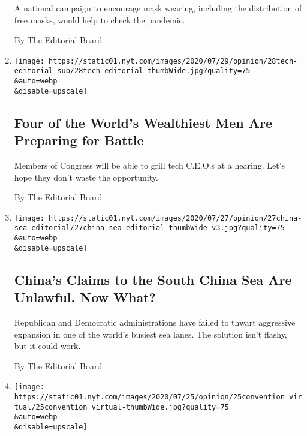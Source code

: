 \begin{enumerate}
  A national campaign to encourage mask wearing, including the
  distribution of free masks, would help to check the pandemic.

  By The Editorial Board
\item
  \href{/2020/07/28/opinion/tech-ceo-hearing-congress.html}{}

  \texttt{[image: https://static01.nyt.com/images/2020/07/29/opinion/28tech-editorial-sub/28tech-editorial-thumbWide.jpg?quality=75\\\&auto=webp\\\&disable=upscale]}

  \hypertarget{four-of-the-worlds-wealthiest-men-are-preparing-for-battle}{%
  \subsection{Four of the World's Wealthiest Men Are Preparing for
  Battle}\label{four-of-the-worlds-wealthiest-men-are-preparing-for-battle}}

  Members of Congress will be able to grill tech C.E.O.s at a hearing.
  Let's hope they don't waste the opportunity.

  By The Editorial Board
\item
  \href{/2020/07/27/opinion/pompeo-south-china-sea.html}{}

  \texttt{[image: https://static01.nyt.com/images/2020/07/27/opinion/27china-sea-editorial/27china-sea-editorial-thumbWide-v3.jpg?quality=75\\\&auto=webp\\\&disable=upscale]}

  \hypertarget{chinas-claims-to-the-south-china-sea-are-unlawful-now-what}{%
  \subsection{China's Claims to the South China Sea Are Unlawful. Now
  What?}\label{chinas-claims-to-the-south-china-sea-are-unlawful-now-what}}

  Republican and Democratic administrations have failed to thwart
  aggressive expansion in one of the world's busiest sea lanes. The
  solution isn't flashy, but it could work.

  By The Editorial Board
\item
  \href{/2020/07/25/opinion/sunday/republican-convention-trump.html}{}

  \texttt{[image: https://static01.nyt.com/images/2020/07/25/opinion/25convention\_virtual/25convention\_virtual-thumbWide.jpg?quality=75\\\&auto=webp\\\&disable=upscale]}

  \hypertarget{the-pandemic-could-make-political-conventions-less-terrible}{%
}
\end{enumerate}
